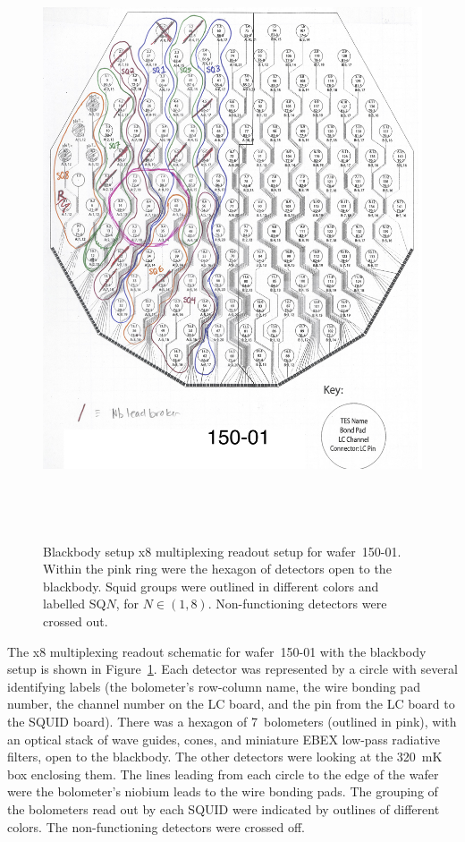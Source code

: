 \begin{figure}[htp]
\begin{center}
\includegraphics[height=7in]{figures/EBEX_Nb01_150GHz_wafer_schem.png}
\caption{Blackbody setup x8 multiplexing readout setup for wafer~150-01. Within the pink ring were the hexagon of detectors open to the blackbody. Squid groups were outlined in different colors and labelled SQ$N$, for $N \in (1,8)$. Non-functioning detectors were crossed out. 
\label{fig:bb_wafer_layout} }
\end{center}
\end{figure}


The x8 multiplexing readout schematic for wafer~150-01 with the blackbody setup is shown in Figure~\ref{fig:bb_wafer_layout}. 
Each detector was represented by a circle with several identifying labels (the bolometer's row-column name, the wire bonding pad number, the channel number on the \ac{LC} board, and the pin from the \ac{LC} board to the \ac{SQUID} board).
There was a hexagon of 7~bolometers (outlined in pink), with an optical stack of wave guides, cones, and miniature \ac{EBEX} low-pass radiative filters, open to the blackbody. 
The other detectors were looking at the 320~mK box enclosing them. %
The lines leading from each circle to the edge of the wafer were the bolometer's niobium leads to the wire bonding pads. 
The grouping of the bolometers read out by each \ac{SQUID} were indicated by outlines of different colors.
The non-functioning detectors were crossed off. 

